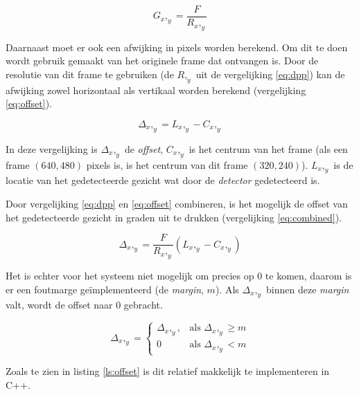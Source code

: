 \begin{equation}
    G_x,_y = \frac{F}{R_x,_y}
    \label{eq:dpp}
\end{equation}

\vfill
\pagebreak

Daarnaast moet er ook een afwijking in pixels worden berekend. Om dit te doen
wordt gebruik gemaakt van het originele frame dat ontvangen is. Door de resolutie
van dit frame te gebruiken (de $R,_y$ uit de vergelijking \ref{eq:dpp}) kan de
afwijking zowel horizontaal als vertikaal worden berekend (vergelijking \ref{eq:offset}).

\begin{equation}
    \Delta_x,_y = {L_x,_y} - {C_x,_y}
    \label{eq:offset}
\end{equation}

In deze vergelijking is $\Delta_x,_y$ de \emph{offset}, $C_x,_y$ is het centrum
van het frame (als een frame $(640,480)$ pixels is, is het
centrum van dit frame $(320,240)$). $L_x,_y$ is de locatie van het gedetecteerde
gezicht wat door de \emph{detector} gedetecteerd is.

Door vergelijking \ref{eq:dpp} en \ref{eq:offset} combineren, is het mogelijk
de offset van het gedetecteerde gezicht in graden uit te drukken (vergelijking
\ref{eq:combined}).

\begin{equation}
    \Delta_x,_y = \frac{F}{R_x,_y}({L_x,_y} - {C_x,_y})
    \label{eq:combined}
\end{equation}

Het is echter voor het systeem niet mogelijk om precies op 0 te komen, daarom
is er een foutmarge geïmplementeerd (de \emph{margin}, $m$). Als $\Delta_x,_y$ binnen
deze \emph{margin} valt, wordt de offset naar 0 gebracht.

\begin{equation}
    \Delta_x,_y = \begin{cases}
        \Delta_x,_y, & \text{als } \Delta_x,_y \geq m\\
        0 & \text{als } \Delta_x,_y < m
    \end{cases}
\end{equation}

Zoals te zien in listing \ref{ls:offset} is dit relatief makkelijk te implementeren
in C++.

